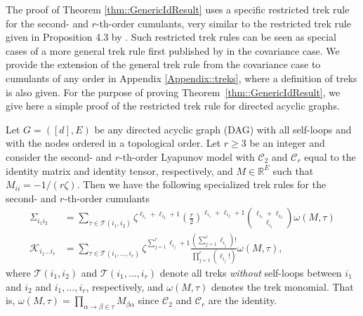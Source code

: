 \documentclass{biometrika}
\begin{document}
The proof of Theorem \ref{thm::GenericIdResult} uses a specific restricted trek rule for the second- and $r$-th-order cumulants, very similar to the restricted trek rule given in Proposition 4.3 by \cite{boege2024conditionalindependencestationarydiffusions}. Such restricted trek rules can be seen as special cases of a more general trek rule first published by \cite{hansen2024trekrulelyapunovequation} in the covariance case. We provide the extension of the general trek rule from the covariance case to 
cumulants of any order in Appendix \ref{Appendix::treks}, where a definition of treks is also given. 
For the purpose of proving Theorem~\ref{thm::GenericIdResult}, we give here a simple proof of the 
restricted trek rule for directed acyclic graphs. 

\begin{lemma}
    \label{lem::simplifiedtrekruleDAG}
    Let $G = ([d], E)$ be any directed acyclic graph (DAG) with all self-loops and with the nodes ordered in a topological order. Let $r \geq 3$ be an integer and consider the second- and $r$-th-order Lyapunov model with  $\mathcal{C}_2$ and $\mathcal{C}_r$ equal to the identity matrix and identity tensor, respectively, and $M \in \mathbb{R}^{E}$ such that $M_{ii} = -1/(r \zeta)$. Then we have the following specialized trek rules for the second- and $r$-th-order cumulants
    \begin{align*}
        \Sigma_{i_1 i_2} &=  \sum_{ \tau \in \mathcal{T}(i_1, i_2)} \zeta^{\ell_{i_1} + \ell_{i_2} + 1}  \left(\frac{r}{2} \right )^{\ell_{i_1} + \ell_{i_2} + 1}  \binom{\ell_{i_1} + \ell_{i_2}}{\ell_{i_1}} \omega(M, \tau) \\ 
        \mathcal{K} _{i_1 \dots i_r} &= \sum_{ \tau \in \mathcal{T}(i_1, \dots, i_r)}  \zeta^{\sum_{j = 1}^r\ell_{i_j} +1} \frac{(\sum_{j = 1}^r\ell_{i_j} )!}{\prod_{j = 1}^r (\ell_{i_j}!) } \omega(M, \tau),
    \end{align*}
    where $\mathcal{T}(i_1, i_2)$ and $\mathcal{T}(i_1, \dots, i_r)$ denote all treks \textit{without} self-loops between $i_1$ and $i_2$ and $i_1, \dots, i_r$, respectively, and 
    $\omega(M,\tau)$ denotes the trek monomial. That is, $\omega(M, \tau) = \prod_{ \alpha \rightarrow \beta \in \tau} M_{\beta \alpha}$ since $\mathcal{C}_2$ and $\mathcal{C}_r$ are the identity.  
\end{lemma}
\end{document}
